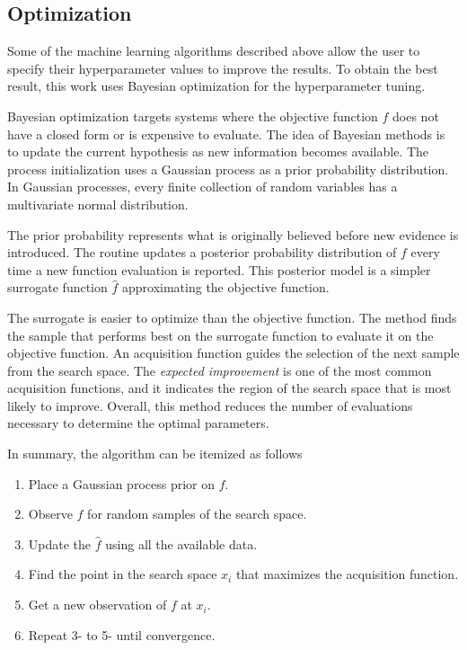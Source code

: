 \subsection{Optimization}
\label{sec:opt}


Some of the machine learning algorithms described above allow the user to specify their hyperparameter values to improve the results.
To obtain the best result, this work uses Bayesian optimization for the hyperparameter tuning.

Bayesian optimization targets systems where the objective function $f$ does not have a closed form or is expensive to evaluate.
The idea of Bayesian methods is to update the current hypothesis as new information becomes available.
The process initialization uses a Gaussian process as a prior probability distribution.
In Gaussian processes, every finite collection of random variables has a multivariate normal distribution.

The prior probability represents what is originally believed before new evidence is introduced.
The routine updates a posterior probability distribution of $f$ every time a new function evaluation is reported.
This posterior model is a simpler surrogate function $\hat{f}$ approximating the objective function. 

The surrogate is easier to optimize than the objective function.
The method finds the sample that performs best on the surrogate function to evaluate it on the objective function.
An acquisition function guides the selection of the next sample from the search space.
The \textit{expected improvement} is one of the most common acquisition functions, and it indicates the region of the search space that is most likely to improve.
Overall, this method reduces the number of evaluations necessary to determine the optimal parameters.

In summary, the algorithm can be itemized as follows
\begin{enumerate}
\item Place a Gaussian process prior on $f$.
\item Observe $f$ for random samples of the search space.
\item Update the $\hat{f}$ using all the available data.
\item Find the point in the search space $x_i$ that maximizes the acquisition function.
\item Get a new observation of $f$ at $x_i$.
\item Repeat 3- to 5- until convergence.
\end{enumerate}

